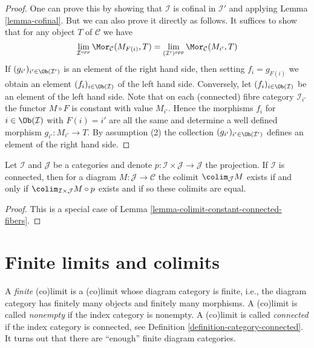 \begin{proof}
One can prove this by showing that $\mathcal{I}$ is cofinal in
$\mathcal{I}'$ and applying Lemma \ref{lemma-cofinal}.
But we can also prove it directly as follows.
It suffices to show that for any object $T$ of $\mathcal{C}$ we have
$$
\lim_{\mathcal{I}^{opp}} \Mor_\mathcal{C}(M_{F(i)}, T)
=
\lim_{(\mathcal{I}')^{opp}} \Mor_\mathcal{C}(M_{i'}, T)
$$
If $(g_{i'})_{i' \in \Ob(\mathcal{I}')}$ is an element of
the right hand side, then setting $f_i = g_{F(i)}$ we obtain an
element $(f_i)_{i \in \Ob(\mathcal{I})}$ of the left hand side.
Conversely, let $(f_i)_{i \in \Ob(\mathcal{I})}$ be an element of the
left hand side. Note that on each (connected)
fibre category $\mathcal{I}_{i'}$ the functor $M \circ F$
is constant with value $M_{i'}$. Hence the morphisms
$f_i$ for $i \in \Ob(\mathcal{I})$ with $F(i) = i'$
are all the same and determine a well defined morphism
$g_{i'} : M_{i'} \to T$. By assumption (2) the collection
$(g_{i'})_{i' \in \Ob(\mathcal{I}')}$ defines an element
of the right hand side.
\end{proof}

\begin{lemma}
\label{lemma-product-with-connected}
Let $\mathcal{I}$ and $\mathcal{J}$ be a categories and denote
$p : \mathcal{I} \times \mathcal{J} \to \mathcal{J}$ the projection.
If $\mathcal{I}$ is connected, then for a diagram
$M : \mathcal{J} \to \mathcal{C}$ the colimit $\colim_\mathcal{J} M$ exists
if and only if $\colim_{\mathcal{I} \times \mathcal{J}} M \circ p$ exists and
if so these colimits are equal.
\end{lemma}

\begin{proof}
This is a special case of Lemma \ref{lemma-colimit-constant-connected-fibers}.
\end{proof}






\section{Finite limits and colimits}
\label{section-finite-limits}

\noindent
A {\it finite} (co)limit is a (co)limit whose diagram category is finite,
i.e., the diagram category has finitely many objects and finitely many
morphisms. A (co)limit is called {\it nonempty} if the index category is
nonempty. A (co)limit is called {\it connected} if the index category is
connected, see
Definition \ref{definition-category-connected}.
It turns out that there are ``enough'' finite diagram categories.

